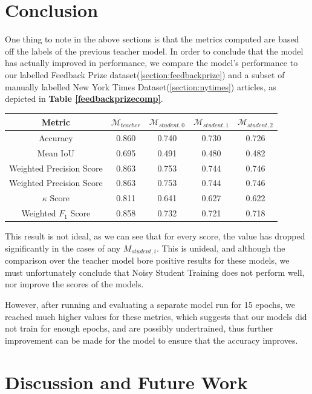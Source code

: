 \documentclass[12pt]{article}
\begin{document}
{\section{Conclusion}
One thing to note in the above sections is that the metrics computed are based off the labels of the previous teacher model. In order to conclude that the model has actually improved in performance, we compare the model's performance to our labelled Feedback Prize dataset(\ref{section:feedbackprize}) and a subset of manually labelled New York Times Dataset(\ref{section:nytimes}) articles, as depicted in \textbf{Table \ref{feedbackprizecomp}}.
\begin{center}
\begin{tabular}{c|c c c c}
Metric & $\mathcal{M}_{teacher}$ & $\mathcal{M}_{student, 0}$ & $\mathcal{M}_{student, 1}$ & $\mathcal{M}_{student, 2}$ \\
\hline Accuracy & 0.860 & 0.740 & 0.730 & 0.726 \\
Mean IoU & 0.695 & 0.491 & 0.480 & 0.482 \\
Weighted Precision Score & 0.863 & 0.753 & 0.744 & 0.746 \\
Weighted Precision Score & 0.863 & 0.753 & 0.744 & 0.746 \\
$\kappa$ Score & 0.811 & 0.641 & 0.627 & 0.622 \\
Weighted $F_1$ Score & 0.858 & 0.732 & 0.721 & 0.718 \\
\end{tabular}
\label{feedbackprizecomp}
\end{center}

This result is not ideal, as we can see that for every score, the value has dropped significantly in the cases of any $M_{student, i}$. This is unideal, and although the comparison over the teacher model bore positive results for these models, we must unfortunately conclude that Noisy Student Training does not perform well, nor improve the scores of the models.

However, after running and evaluating a separate model run for 15 epochs, we reached much higher values for these metrics, which suggests that our models did not train for enough epochs, and are possibly undertrained, thus further improvement can be made for the model to ensure that the accuracy improves.

\section{Discussion and Future Work}

}
\end{document}
